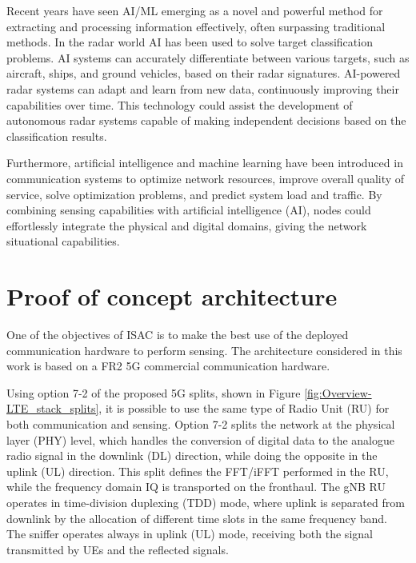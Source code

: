 	Recent years have seen AI/ML emerging as a novel and powerful method for extracting and processing information effectively, often surpassing traditional methods.
	In the radar world AI has been used to solve target classification problems. 
	AI systems can accurately differentiate between various targets, such as aircraft, ships, and ground vehicles, based on their radar signatures. 
	AI-powered radar systems can adapt and learn from new data, continuously improving their capabilities over time. 
	This technology could assist the development of autonomous radar systems capable of making independent decisions based on the classification results. 
	
	 Furthermore, artificial intelligence and machine learning have been introduced in communication systems to optimize network resources, improve overall quality of service, solve optimization problems, and predict system load and traffic. 
	 By combining sensing capabilities with artificial intelligence (AI), nodes could effortlessly integrate the physical and digital domains, giving the network situational capabilities.
	


\section{Proof of concept architecture}
	\label{sec:intro-PoCarchitecture}
	
	One of the objectives of ISAC is to make the best use of the deployed communication hardware to perform sensing. 
	The architecture considered in this work is based on a FR2 5G commercial communication hardware.
	
	Using option 7-2 of the proposed 5G splits, shown in Figure \ref{fig:Overview-LTE_stack_splits}, it is possible to use the same type of Radio Unit (RU) for both communication and sensing.
	Option 7-2 splits the network at the physical layer (PHY) level, which handles the conversion of digital data to the analogue radio signal in the downlink (DL) direction, while doing the opposite in the uplink (UL) direction.
	This split defines the FFT/iFFT performed in the RU, while the frequency domain IQ is transported on the fronthaul.
	The gNB RU operates in time-division duplexing (TDD) mode, where uplink is separated from downlink by the allocation of different time slots in the same frequency band. 	
	The sniffer operates always in uplink (UL) mode, receiving both the signal transmitted by UEs and the reflected signals. 
	
